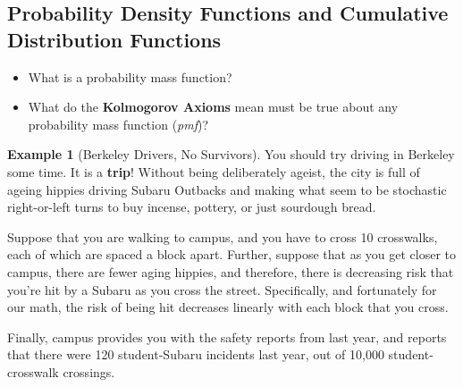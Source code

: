\documentclass[
]{book}
\providecommand{\tightlist}{%
  \setlength{\itemsep}{0pt}\setlength{\parskip}{0pt}}
\theoremstyle{definition}
\theoremstyle{definition}
\newtheorem{example}{Example}[chapter]
\theoremstyle{definition}
\theoremstyle{definition}
\theoremstyle{remark}
\begin{document}
\subsection{Probability Density Functions and Cumulative Distribution Functions}\label{probability-density-functions-and-cumulative-distribution-functions}

\begin{itemize}
\tightlist
\item
  What is a probability mass function?
\item
  What do the \textbf{Kolmogorov Axioms} mean must be true about any probability mass function (\emph{pmf})?
\end{itemize}

\begin{example}[Berkeley Drivers, No Survivors]

You should try driving in Berkeley some time. It is a \textbf{trip}! Without being deliberately ageist, the city is full of ageing hippies driving Subaru Outbacks and making what seem to be stochastic right-or-left turns to buy incense, pottery, or just sourdough bread.

Suppose that you are walking to campus, and you have to cross 10 crosswalks, each of which are spaced a block apart. Further, suppose that as you get closer to campus, there are fewer aging hippies, and therefore, there is decreasing risk that you're hit by a Subaru as you cross the street. Specifically, and fortunately for our math, the risk of being hit decreases linearly with each block that you cross.

Finally, campus provides you with the safety reports from last year, and reports that there were 120 student-Subaru incidents last year, out of 10,000 student-crosswalk crossings.


\end{example}
\end{document}
